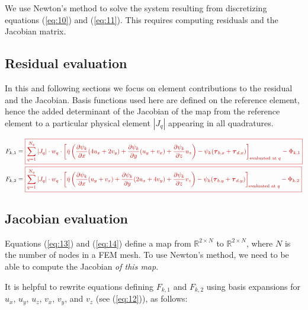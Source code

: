 \documentclass{amsart}
\newcommand{\T}{\boldsymbol{\tau}}
\newcommand{\diff}[2]{\ensuremath{\frac{\partial #1}{\partial #2}}}
\newcommand{\sumQ}{\ensuremath{\sum_{q = 1}^{N_q}}}
\newcommand{\basalshearstress}[1]{\T_{b#1}}
\newcommand{\taubx}{\basalshearstress{,x}}
\newcommand{\tauby}{\basalshearstress{,y}}
\newcommand{\drivingstress}[1]{\T_{d#1}}
\newcommand{\taudx}{\drivingstress{,x}}
\newcommand{\taudy}{\drivingstress{,y}}
\newcommand{\highlight}[1]{{\color{red!80!black} \fbox{$ \displaystyle #1 $} }}
\newcommand{\R}{\mathbb{R}}
\begin{document}
We use Newton's method to solve the system resulting from discretizing equations (\ref{eq:10}) and (\ref{eq:11}). This requires computing residuals and the Jacobian matrix.

\subsection{Residual evaluation}
\label{sec-3-1}

In this and following sections we focus on element contributions to the residual and the Jacobian. Basis functions used here are defined on the reference element, hence the added determinant of the Jacobian of the map from the reference element to a particular physical element $|J_q|$ appearing in all quadratures.

\begin{align}
  \label{eq:13}
  F_{k,1} & = \highlight{ \sumQ |J_q| \cdot w_q\cdot \left[ \bar\eta \left( \diff{\psi_k}{x} (\Mux) + \diff{\psi_k}{y} (\Muy) + \diff{\psi_k}{z}\Muz \right) - \psi_k (\taubx + \taudx) \right]_{\text{evaluated at } q} - \Phi_{k,1} }\\
  \label{eq:14}
  F_{k,2} & = \highlight{ \sumQ |J_q| \cdot w_q\cdot \left[ \bar\eta \left( \diff{\psi_k}{x} (\Mvx) + \diff{\psi_k}{y} (\Mvy)+ \diff{\psi_k}{z}\Mvz \right) - \psi_k (\tauby + \taudy) \right]_{\text{evaluated at } q} - \Phi_{k,2}}
\end{align}


\subsection{Jacobian evaluation}
\label{sec-3-2}

Equations (\ref{eq:13}) and (\ref{eq:14}) define a map from $\R^{2\times N}$ to $\R^{2\times N}$, where $N$ is the number of nodes in a FEM mesh. To use Newton's method, we need to be able to compute the Jacobian \emph{of this map}.

It is helpful to rewrite equations defining $F_{k,1}$ and $F_{k,2}$ using basis expansions for $u_x$, $u_y$, $u_z$, $v_x$, $v_y$, and $v_z$ (see (\ref{eq:12})), as follows:
\end{document}
